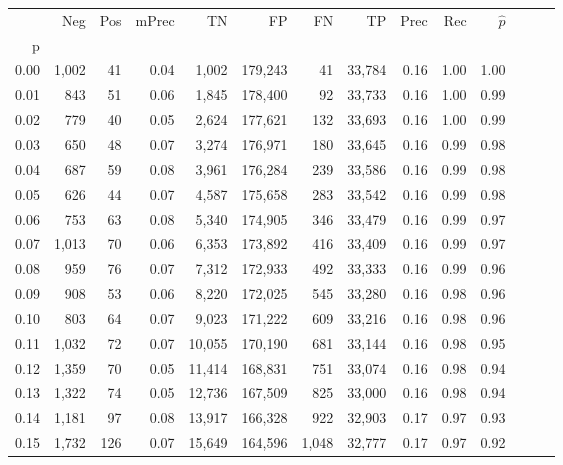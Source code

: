 \begin{tabular}{rrrrrrrrrrrrrr}
\toprule
{} &    Neg &  Pos & mPrec &       TN &       FP &      FN &      TP &  Prec &   Rec & $\hat{p}$ \\
p    &        &      &       &          &          &         &         &       &       &           \\
\midrule
0.00 &  1,002 &   41 &  0.04 &    1,002 &  179,243 &      41 &  33,784 &  0.16 &  1.00 &      1.00 \\
0.01 &    843 &   51 &  0.06 &    1,845 &  178,400 &      92 &  33,733 &  0.16 &  1.00 &      0.99 \\
0.02 &    779 &   40 &  0.05 &    2,624 &  177,621 &     132 &  33,693 &  0.16 &  1.00 &      0.99 \\
0.03 &    650 &   48 &  0.07 &    3,274 &  176,971 &     180 &  33,645 &  0.16 &  0.99 &      0.98 \\
0.04 &    687 &   59 &  0.08 &    3,961 &  176,284 &     239 &  33,586 &  0.16 &  0.99 &      0.98 \\
0.05 &    626 &   44 &  0.07 &    4,587 &  175,658 &     283 &  33,542 &  0.16 &  0.99 &      0.98 \\
0.06 &    753 &   63 &  0.08 &    5,340 &  174,905 &     346 &  33,479 &  0.16 &  0.99 &      0.97 \\
0.07 &  1,013 &   70 &  0.06 &    6,353 &  173,892 &     416 &  33,409 &  0.16 &  0.99 &      0.97 \\
0.08 &    959 &   76 &  0.07 &    7,312 &  172,933 &     492 &  33,333 &  0.16 &  0.99 &      0.96 \\
0.09 &    908 &   53 &  0.06 &    8,220 &  172,025 &     545 &  33,280 &  0.16 &  0.98 &      0.96 \\
0.10 &    803 &   64 &  0.07 &    9,023 &  171,222 &     609 &  33,216 &  0.16 &  0.98 &      0.96 \\
0.11 &  1,032 &   72 &  0.07 &   10,055 &  170,190 &     681 &  33,144 &  0.16 &  0.98 &      0.95 \\
0.12 &  1,359 &   70 &  0.05 &   11,414 &  168,831 &     751 &  33,074 &  0.16 &  0.98 &      0.94 \\
0.13 &  1,322 &   74 &  0.05 &   12,736 &  167,509 &     825 &  33,000 &  0.16 &  0.98 &      0.94 \\
0.14 &  1,181 &   97 &  0.08 &   13,917 &  166,328 &     922 &  32,903 &  0.17 &  0.97 &      0.93 \\
0.15 &  1,732 &  126 &  0.07 &   15,649 &  164,596 &   1,048 &  32,777 &  0.17 &  0.97 &      0.92 \\

\end{tabular}

